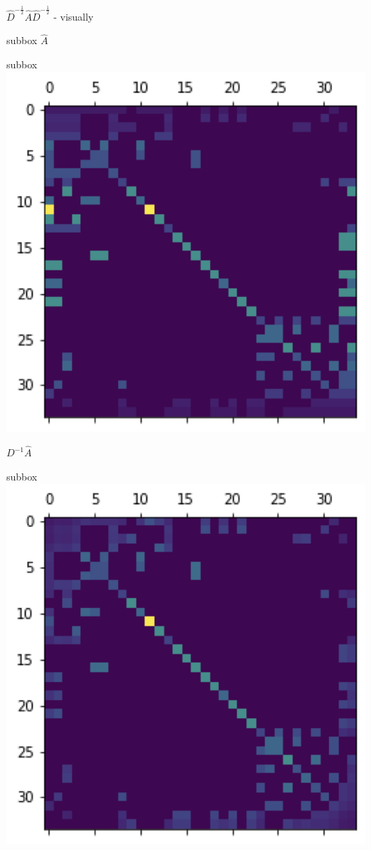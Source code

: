 \documentclass[a4paper,11pt]{book}
\begin{document}
\begin{textbox}{ $\hat{D}^{-\frac{1}{2}}\hat{A}\hat{D}^{-\frac{1}{2}}$ - visually}
\begin{multibox}{2}
\begin{subbox}{subbox}{}
$\hat{A}$
\end{subbox}
\end{multibox}

\begin{multibox}{2}

\begin{subbox}{subbox}{}
\centering
\includegraphics[width=1\linewidth]{pics/DA.png}

$D^{-1}\hat{A}$
\end{subbox}
\begin{subbox}{subbox}{}
\centering
\includegraphics[width=1\linewidth]{pics/DAD.png}


\end{subbox}
\end{multibox}
\end{textbox}
\end{document}
